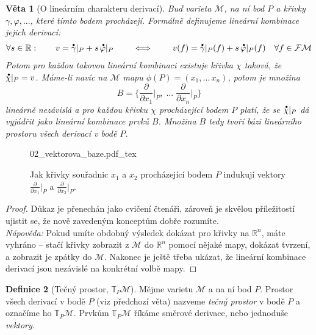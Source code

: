 \documentclass{article}
\newcommand{\incfig}[1]{%
    \def\svgwidth{\columnwidth}
    {#1.pdf_tex}
}
\newtheorem{theorem}{Věta}[section]
\theoremstyle{definition}
\newtheorem{definition}[theorem]{Definice}
\def\ph{\phantom}
\newcommand{\pd}[2]{\frac{\partial  #1}{\partial  #2}}
\renewcommand{\dot}[1]{\accentset{\bullet}{#1}}
\newcommand{\f}{\varphi}
\newcommand{\R}{\mathbb{R}}
\def\Manif{\mathcal{M}}
\def\Func{\mathcal{F}}
\def\Tang{\mathbb{T}}
\begin{document}
\begin{theorem}[O lineárním charakteru derivací]
Buď varieta $\Manif$, na ní bod $P$ a křivky $\gamma, \f, ...$, které tímto bodem procházejí. Formálně definujeme lineární kombinace jejich derivací:
\begin{gather*}
    \forall s \in \R:
    \qquad
    v = \dot\gamma|_P + s \, \dot\f|_P
    \qquad \iff \qquad
    v(f) = \dot\gamma|_P(f) + s \, \dot\f|_P(f)
    \quad \forall f \in \Func\Manif
\end{gather*}
Potom pro každou takovou lineární kombinaci existuje křivka $\chi$ taková, že $\dot\chi|_P = v$.
Máme-li navíc na $\Manif$ mapu $\phi(P) = (x_1, ... \, x_n)$, potom je množina
\begin{equation*}
    B =
    \Big\{
        \pd{}{x_1}\Big|_P,
        \; ... \;
        \pd{}{x_n}\Big|_P
    \Big\}
\end{equation*}
lineárně nezávislá a pro každou křivku $\chi$ procházející bodem $P$ platí, že se $\dot\chi|_P$ dá vyjádřit jako lineární kombinace prvků $B$. Množina $B$ tedy tvoří bázi lineárního prostoru všech derivací v bodě $P$.
\end{theorem}
\ph{.}\vspace{-2.5\baselineskip}
\begin{wrapfigure}{r}{8cm}
    \centering
    \def\columnwidth{8cm}
    \incfig{02_vektorova_baze}
    \vspace{-2.2\baselineskip}
    \caption{Jak křivky souřadnic $x_1$ a $x_2$ procházející bodem $P$ indukují vektory $\pd{}{x_1} \!\big|_P$ a $\pd{}{x_2} \!\big|_P$.}
    \label{obr:vektor}
    \vspace{-2\baselineskip}
\end{wrapfigure}
\begin{proof}
Důkaz je přenechán jako cvičení čtenáři, zároveň je skvělou příležitostí ujistit se, že nově zavedeným konceptům dobře rozumíte.
\medskip\\
\textit{Nápověda:} Pokud umíte obdobný výsledek dokázat pro křivky na $\R^n$, máte vyhráno – stačí křivky zobrazit z $\Manif$ do $\R^n$ pomocí nějaké mapy, dokázat tvrzení, a zobrazit je zpátky do $\Manif$. Nakonec je ještě třeba ukázat, že lineární kombinace derivací jsou nezávislé na konkrétní volbě mapy.
\end{proof}

\begin{definition}[Tečný prostor, $\Tang_P\Manif$]
    Mějme varietu $\Manif$ a na ní bod $P$. Prostor všech derivací v bodě $P$ (viz předchozí věta) nazveme \textit{tečný prostor} v bodě $P$ a označíme ho $\Tang_P\Manif$. Prvkům $\Tang_P\Manif$ říkáme směrové derivace, nebo jednoduše \textit{vektory}.
\end{definition}
\end{document}
